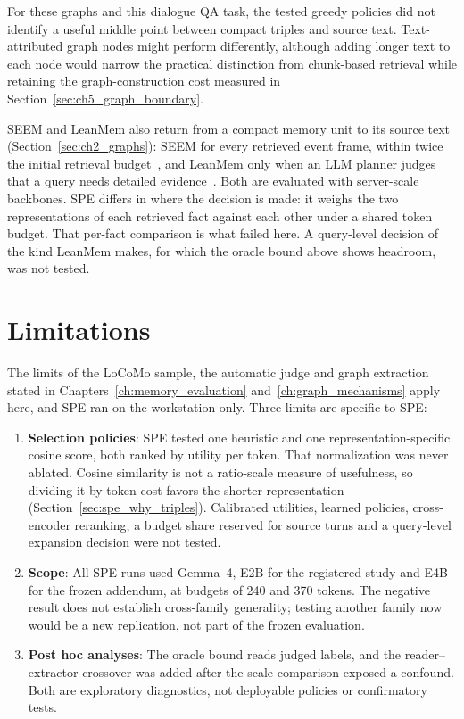 For these graphs and this dialogue QA task, the tested greedy policies did not identify a useful
middle point between compact triples and source text. Text-attributed graph nodes might perform
differently, although adding longer text to each node would narrow the practical distinction from
chunk-based retrieval while retaining the graph-construction cost measured in
Section~\ref{sec:ch5_graph_boundary}.

SEEM and LeanMem also return from a compact memory unit to its source text
(Section~\ref{sec:ch2_graphs}): SEEM for every
retrieved event frame, within twice the initial retrieval budget~\citep{seem}, and LeanMem
only when an LLM planner judges that a query needs detailed evidence~\citep{leanmem}. Both
are evaluated with server-scale backbones. SPE differs in where the decision is made: it
weighs the two representations of each retrieved fact against each other under a shared
token budget. That per-fact comparison is what failed here. A query-level decision of the
kind LeanMem makes, for which the oracle bound above shows headroom, was not tested.

\section{Limitations}
\label{sec:spe_limitations}

The limits of the LoCoMo sample, the automatic judge and graph extraction stated in
Chapters~\ref{ch:memory_evaluation} and~\ref{ch:graph_mechanisms} apply here, and SPE ran on the
workstation only. Three limits are specific to SPE:
\begin{enumerate}
  \item \textbf{Selection policies}: SPE tested one heuristic and one representation-specific cosine
        score, both ranked by utility per token. That normalization was never ablated. Cosine
        similarity is not a ratio-scale measure of usefulness, so dividing it by token cost favors the
        shorter representation (Section~\ref{sec:spe_why_triples}). Calibrated utilities, learned
        policies, cross-encoder reranking, a budget share reserved for source turns and a query-level
        expansion decision were not tested.
  \item \textbf{Scope}: All SPE runs used Gemma~4, E2B for the registered study and E4B for the frozen
        addendum, at budgets of 240 and 370 tokens. The negative result does not establish cross-family
        generality; testing another family now would be a new replication, not part of the frozen
        evaluation.
  \item \textbf{Post hoc analyses}: The oracle bound reads judged labels, and the reader--extractor
        crossover was added after the scale comparison exposed a confound. Both are exploratory
        diagnostics, not deployable policies or confirmatory tests.
\end{enumerate}

